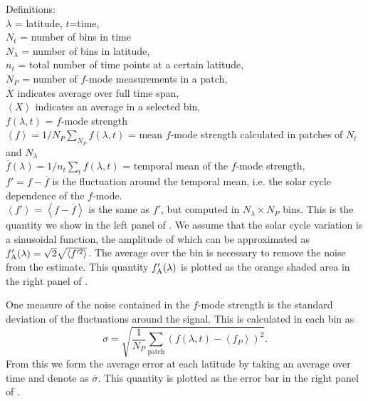 \documentclass{aa}
\begin{document}
Definitions:\\
$\lambda$ = latitude, $t$=time, \\
$N_t$ = number of bins in time \\
$N_\lambda$ = number of bins in latitude, \\
$n_t$ = total number of time points at a certain latitude, \\
$N_P$ = number of $f$-mode measurements in a patch, \\
$\overline{X}$ indicates average over full time span, \\
$\left< X \right>$ indicates an average in a selected bin, \\
$f(\lambda,t)$ = $f$-mode strength \\
$\left< f \right>=1/N_P \sum_{N_P} f (\lambda,t)$ = mean $f$-mode strength calculated in patches of $N_t$ and $N_\lambda$ \\
$\overline{f}(\lambda) = 1/n_t \sum_t f(\lambda,t)$ = temporal mean of the $f$-mode strength, \\
$f'=f-\overline{f}$ is the fluctuation around the temporal mean, i.e. the solar cycle dependence of the $f$-mode.\\
$\left< f' \right> = \left< f - \overline{f} \right> $ is the same as $f'$, but computed in $N_\lambda \times N_P$ bins. This is the quantity we show in the left panel of .
We assume that the solar cycle variation is a sinusoidal function, the amplitude of which can be approximated as 
$f'_{\rm A} (\lambda) = 
\sqrt{2} \sqrt{\left<{f'^2}\right>}$. 
The average over the bin is necessary to remove the noise from the estimate.
This quantity $f'_{\rm A} (\lambda)$ is plotted as the orange shaded area in the right panel of .

One measure of the noise contained in the $f$-mode strength is the standard deviation of the fluctuations
around the signal. This is calculated in each bin as
\begin{equation}
\sigma= \sqrt{\frac{1}{N_P}\sum_{\mbox{patch}} ( f(\lambda,t)
- \left<f_P\right>)^2}.
\end{equation}
From this we form the average error at each latitude by taking an average over time and denote as $\overline{\sigma}$. 
This quantity is plotted as the error bar in the right panel of .
\end{document}
